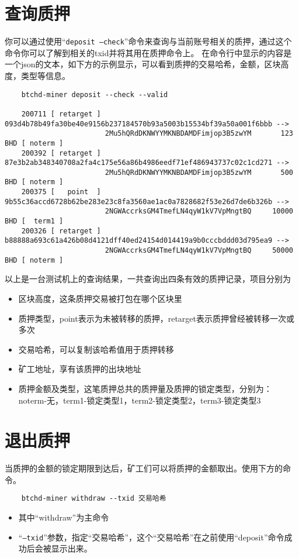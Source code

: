 \section{查询质押}
\begin{flushleft}
    你可以通过使用``\texttt{deposit --check}''命令来查询与当前账号相关的质押，通过这个命令你可以了解到相关的txid并将其用在质押命令上。
    在命令行中显示的内容是一个json的文本，如下方的示例显示，可以看到质押的交易哈希，金额，区块高度，类型等信息。
\end{flushleft}
\scriptsize
\begin{verbatim}
    btchd-miner deposit --check --valid

    200711 [ retarget ] 093d4b78b49fa30be40e9156b237184570b93a5003b15534bf39a50a001f6bbb -->
                        2Mu5hQRdDKNWYYMKNBDAMDFimjop3B5zwYM       123 BHD [ noterm ]
    200392 [ retarget ] 87e3b2ab348340708a2fa4c175e56a86b4986eedf71ef486943737c02c1cd271 -->
                        2Mu5hQRdDKNWYYMKNBDAMDFimjop3B5zwYM       500 BHD [ noterm ]
    200375 [   point  ] 9b55c36accd6728b62be283e23c8fa3560ae1ac0a7828682f53e26d7de6b326b -->
                        2NGWAccrksGM4TmefLN4qyW1kV7VpMngtBQ     10000 BHD [  term1 ]
    200326 [ retarget ] b88888a693c61a426b08d4121dff40ed24154d014419a9b0cccbddd03d795ea9 -->
                        2NGWAccrksGM4TmefLN4qyW1kV7VpMngtBQ     50000 BHD [ noterm ]
\end{verbatim}
\normalsize
\begin{flushleft}
    以上是一台测试机上的查询结果，一共查询出四条有效的质押记录，项目分别为
\end{flushleft}
\begin{itemize}
    \item 区块高度，这条质押交易被打包在哪个区块里
    \item 质押类型，point表示为未被转移的质押，retarget表示质押曾经被转移一次或多次
    \item 交易哈希，可以复制该哈希值用于质押转移
    \item 矿工地址，享有该质押的出块地址
    \item 质押金额及类型，这笔质押总共的质押量及质押的锁定类型，分别为：noterm-无，term1-锁定类型1，term2-锁定类型2，term3-锁定类型3
\end{itemize}
\section{退出质押}
\begin{flushleft}
    当质押的金额的锁定期限到达后，矿工们可以将质押的金额取出。使用下方的命令。
\end{flushleft}
\scriptsize
\begin{verbatim}
    btchd-miner withdraw --txid 交易哈希
\end{verbatim}
\normalsize
\begin{itemize}
    \item 其中``withdraw''为主命令
    \item ``\texttt{--txid}''参数，指定``交易哈希''，这个``交易哈希''在之前使用``deposit''命令成功后会被显示出来。
\end{itemize}
